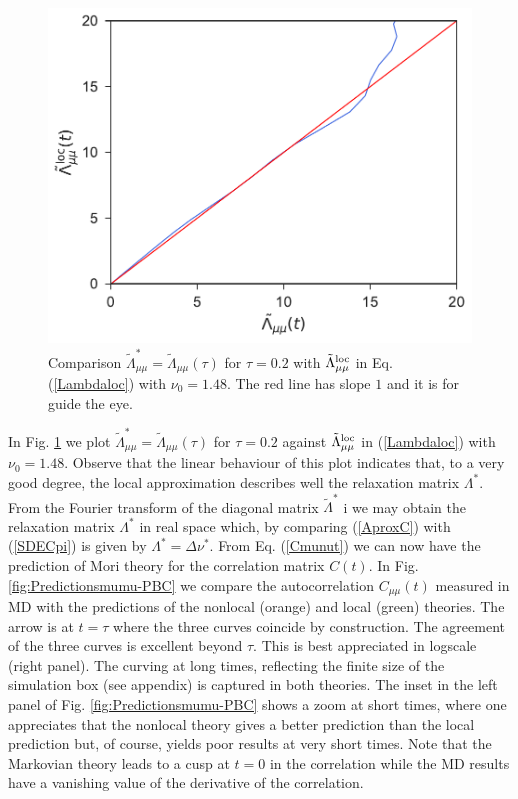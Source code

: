 \documentclass[a4paper,openright,12pt]{book}
\newcommand{\Pendiente}[1]{{\color{green}#1}} %
\begin{document}
\begin{figure}[h!]
  \centering
\includegraphics[scale=0.45]{CompareLambdas-PBC}
\caption[Comparison $\tilde{\Lambda}^*_{\mu\mu}$ and $\tilde{\Lambda}_{\mu\mu}(\tau)$]{Comparison $\tilde{\Lambda}^*_{\mu\mu}=\tilde{\Lambda}_{\mu\mu}(\tau)$ for $\tau=0.2$ with $\tilde{\Lambda}^{\rm loc}_{\mu\mu}$ in Eq. (\ref{Lambdaloc}) with $\nu_0=1.48$. The red line has slope $1$ and it is for guide the eye.}
\label{fig:CompareLambdas-PBC}
\end{figure}
In         Fig.           \ref{fig:CompareLambdas-PBC}         we         plot
$\tilde{\Lambda}^*_{\mu\mu}=\tilde{\Lambda}_{\mu\mu}(\tau)$        for
$\tau=0.2$    against    $\tilde{\Lambda}_{\mu\mu}^{\rm    loc}$    in
(\ref{Lambdaloc})   with  $\nu_0=1.48$. Observe that the linear behaviour of this plot
indicates  that,  to  a  very good  degree,  the  local  approximation
describes well the relaxation matrix $\Lambda^*$.
From the Fourier transform  of the diagonal matrix $\tilde{\Lambda}^*$ i
we may  obtain the relaxation  matrix $\Lambda^*$ in real space which,  by comparing
(\ref{AproxC})      with     (\ref{SDECpi})      is     given      by
$\Lambda^*=\Delta\nu^*$. From Eq.  (\ref{Cmunut}) we can
now  have the  prediction of  Mori theory  for the  correlation matrix
$C(t)$.  In Fig.  \ref{fig:Predictionsmumu-PBC} we compare the autocorrelation
$C_{\mu\mu}(t)$ measured in  MD with the predictions  of the nonlocal
(orange) and local  (green) theories.  The arrow is at  $t=\tau$ where the
three curves  coincide by  construction.  The  agreement of  the three
curves  is  excellent beyond  $\tau$.   This  is best  appreciated  in
logscale (right panel). The curving at long times,
reflecting the  finite size  of the simulation  box \Pendiente{(see  appendix)} is
captured in  both theories.  The inset  in the left panel of Fig.  \ref{fig:Predictionsmumu-PBC}
shows a zoom at short times,  where one appreciates that the nonlocal
theory gives  a better  prediction than the  local prediction  but, of
course,  yields  poor results  at  very  short  times. Note  that  the
Markovian theory leads to a cusp at $t=0$ in the correlation while the
MD  results  have   a  vanishing  value  of  the   derivative  of  the
correlation.
\end{document}
